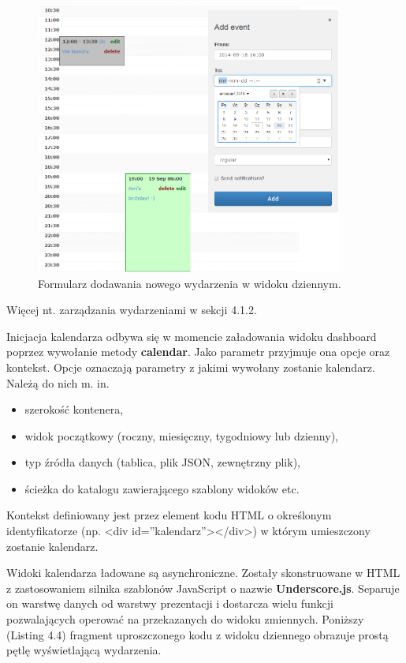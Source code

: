 \begin{figure}[H]
\centering
\includegraphics[width=0.9\textwidth]{add_event.png}
\caption{Formularz dodawania nowego wydarzenia w widoku dziennym.}
\end{figure}

Więcej nt. zarządzania wydarzeniami w sekcji 4.1.2.

Inicjacja kalendarza odbywa się w momencie załadowania widoku dashboard poprzez wywołanie metody \textbf{calendar}. Jako parametr przyjmuje ona opcje oraz kontekst. Opcje oznaczają parametry z jakimi wywołany zostanie kalendarz. Należą do nich m. in.

\begin{itemize}
\item szerokość kontenera,
\item widok początkowy (roczny, miesięczny, tygodniowy lub dzienny),
\item typ źródła danych (tablica, plik JSON, zewnętrzny plik),
\item ścieżka do katalogu zawierającego szablony widoków etc.
\end{itemize}

Kontekst definiowany jest przez element kodu HTML o określonym identyfikatorze (np. <div id=''kalendarz''></div>) w którym umieszczony zostanie kalendarz.

Widoki kalendarza ładowane są asynchroniczne. Zostały skonstruowane w HTML z zastosowaniem silnika szablonów JavaScript o nazwie \textbf{Underscore.js}\cite{underscore}. Separuje on warstwę danych od warstwy prezentacji i dostarcza wielu funkcji pozwalających operować na przekazanych do widoku zmiennych. Poniższy (Listing 4.4) fragment uproszczonego kodu z widoku dziennego obrazuje prostą pętlę wyświetlającą wydarzenia.


